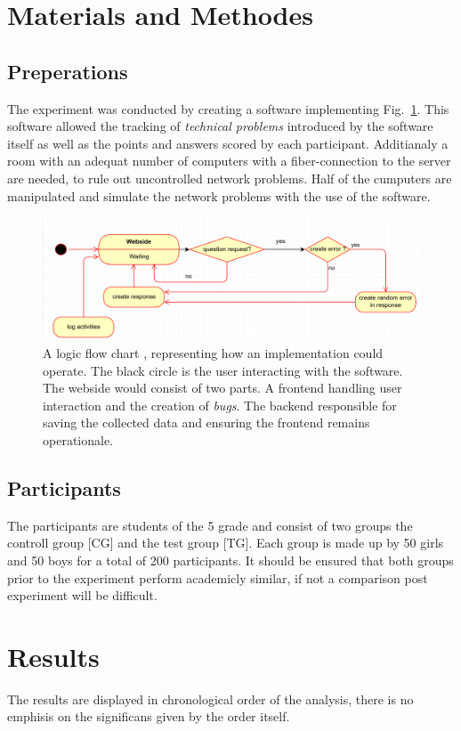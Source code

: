 \documentclass[runningheads]{llncs}
\begin{document}
\section{Materials and Methodes}
\subsection{Preperations}
The experiment was conducted by creating a software implementing Fig.~\ref{fig1}.
This software allowed the tracking of {\itshape technical problems} introduced by
the software itself as well as the points and answers scored by each participant.
Additianaly a room with an adequat number of computers with a fiber-connection
to the server are needed, to rule out uncontrolled network problems.
Half of the cumputers are manipulated and simulate the network problems with the
use of the software.

\begin{figure}
    \includegraphics[width=\textwidth]{UML Prototyp.PNG}
    \caption{A logic flow chart , representing how an implementation could operate.
    The black circle is the user interacting with the software. The webside would
    consist of two parts. A frontend handling user interaction and the creation of {\itshape bugs}.
    The backend responsible for saving the collected data and ensuring the frontend
    remains operationale.} \label{fig1}
\end{figure}

\subsection{Participants}
The participants are students of the 5 grade and consist of two groups the controll group [CG] and
the test group [TG]. Each group is made up by 50 girls and 50 boys for a total of 200 participants.
It should be ensured that both groups prior to the experiment perform academicly similar, if not a
comparison post experiment will be difficult.

\newpage
\section{Results}
The results are displayed in chronological order of the analysis, there is
no emphisis on the significans given by the order itself.
\end{document}
